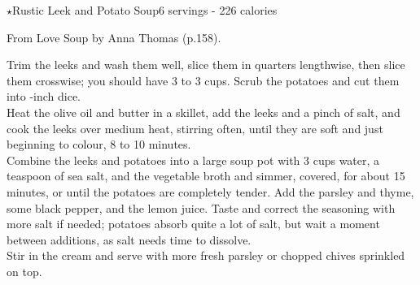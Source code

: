 \begin{recipe}{$\star$Rustic Leek and Potato Soup}{6 servings - 226 calories}{}

\freeform From {\normalfont Love Soup} by Anna Thomas (p.158).


Trim the leeks and wash them well, slice them in quarters lengthwise, then slice them crosswise; you should have 3 to 3  cups. Scrub the potatoes and cut them into -inch dice.\\

Heat the olive oil and butter in a skillet, add the leeks and a pinch of salt, and cook the leeks over medium heat, stirring often, until they are soft and just beginning to colour, 8 to 10 minutes.\\

Combine the leeks and potatoes into a large soup pot with 3 cups water, a teaspoon of sea salt, and the vegetable broth and simmer, covered, for about 15 minutes, or until the potatoes are completely tender. Add the parsley and thyme, some black pepper, and the lemon juice. Taste and correct the seasoning with more salt if needed; potatoes absorb quite a lot of salt, but wait a moment between additions, as salt needs time to dissolve.\\

Stir in the cream and serve with more fresh parsley or chopped chives sprinkled on top.

\end{recipe}